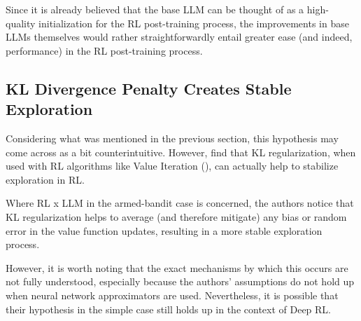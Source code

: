 \documentclass{article} %
\theoremstyle{definition}
\begin{document}
Since it is already believed that the base LLM can be thought of as 
a high-quality initialization for the RL post-training process,
the improvements in base LLMs themselves would
rather straightforwardly entail greater ease (and indeed, performance)
in the RL post-training process.

\subsection{KL Divergence Penalty Creates Stable Exploration}

Considering what was mentioned in the previous section,
this hypothesis may come across as a bit counterintuitive.
However, \cite{Vieillard-et-al-2020} find that KL regularization,
when used with RL algorithms like Value Iteration (\cite{Bellman-1957}),
can actually help to stabilize exploration in RL.

Where RL x LLM in the armed-bandit case is concerned, 
the authors notice that KL regularization helps to average (and therefore
mitigate) any bias or random error in the value function updates,
resulting in a more stable exploration process.

However, it is worth noting that the exact mechanisms by which this occurs 
are not fully understood, especially because the authors' assumptions do not hold up 
when neural network approximators are used.
Nevertheless, it is possible that
their hypothesis in the simple case still holds up in the context of Deep RL.



\end{document}
